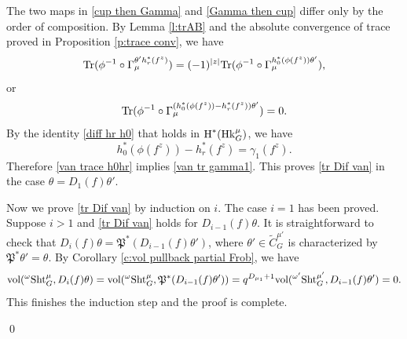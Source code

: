 \documentclass[reqno]{amsart}
\numberwithin{equation}{subsection}
\theoremstyle{definition}
\newcommand\frP{\mathfrak{P}}
\newcommand\Hk{\mathrm{Hk}}
\newcommand\Sht{\textup{Sht}}
\newcommand{\Tr}{\textup{Tr}}
\newcommand{\vol}{\textup{vol}}
\newcommand{\Qlbar}{\overline{\Q}_\ell}
\newcommand{\wt}[1]{\widetilde{#1}}
\newcommand\ot{\otimes}
\renewcommand\c\circ
\newcommand{\cohog}[2]{\textup{H}^{#1}({#2})}     %
\newcommand\g\gamma
\newcommand\G\Gamma
\renewcommand{\th}{\theta}
\newcommand{\om}{\omega}
\newcommand{\Q}{\mathbf{Q}}
\begin{document}
    The two maps in \eqref{cup then Gamma} and \eqref{Gamma then cup} differ only by the order of composition. By Lemma \ref{l:trAB} and the absolute convergence of trace proved in Proposition \ref{p:trace conv}, we have
    \begin{equation*}
        \Tr(\phi^{-1}\c \G_\mu^{\th'h_r^*(f^z)})=(-1)^{|z|}\Tr(\phi^{-1}\c \G_\mu^{h_0^*(\phi(f^z))\th'}),
    \end{equation*}
    or
    \begin{equation}\label{van trace h0hr}
        \Tr(\phi^{-1}\c \G^{(h_0^*(\phi(f^z))-h_r^*(f^z))\th'}_\mu)=0.
    \end{equation}
    By the identity \eqref{diff hr h0} that holds in $\cohog{*}{\Hk^\mu_G}$, we have
    \begin{equation*}
        h_0^*(\phi(f^z))-h_r^*(f^z)=\g_1(f^z).
    \end{equation*}
    Therefore \eqref{van trace h0hr} implies \eqref{van tr gamma1}. This proves \eqref{tr Dif van} in the case $\th=D_1(f)\th'$. 
    
    Now we prove \eqref{tr Dif van} by induction on $i$. The case $i=1$ has been proved. Suppose $i>1$ and \eqref{tr Dif van} holds for $D_{i-1}(f)\th$.  It is straightforward to check that $D_i(f)\th=\frP^*(D_{i-1}(f)\th')$, where $\th'\in \wt C^{\mu'}_G$ is characterized by $\frP^*\th'=\th$. By Corollary \ref{c:vol pullback partial Frob}, we have
    \begin{equation*}
        \vol({}^\om\Sht^\mu_G, D_{i}(f)\th)= \vol({}^\om\Sht^\mu_G, \frP^*(D_{i-1}(f)\th'))=q^{D_{\mu_1}+1} \vol({}^{\om'}\Sht^{\mu'}_G, D_{i-1}(f)\th')=0.
    \end{equation*}
    This finishes the induction step and the proof is complete.
    
\qed


\end{document}
